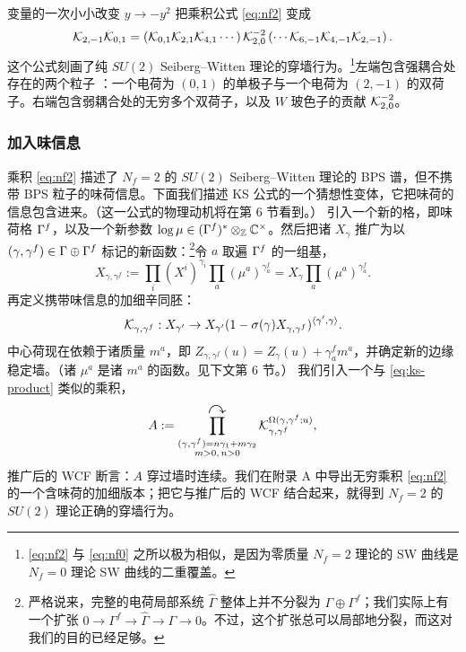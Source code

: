 变量的一次小小改变 $y \to -y^2$ 把乘积公式 \eqref{eq:nf2} 变成
\begin{equation} \label{eq:nf0}
\mathcal{K}_{2,-1} \mathcal{K}_{0,1} = \left( \mathcal{K}_{0,1} \mathcal{K}_{2,1} \mathcal{K}_{4,1} \cdots \right)
\mathcal{K}_{2,0}^{-2} \left( \cdots \mathcal{K}_{6,-1} \mathcal{K}_{4,-1} \mathcal{K}_{2,-1} \right).
\end{equation}
这个公式刻画了纯 $SU(2)$ Seiberg--Witten 理论的穿墙行为。\footnote{\eqref{eq:nf2} 与 \eqref{eq:nf0} 之所以极为相似，是因为零质量 $N_f=2$ 理论的 SW 曲线是 $N_f=0$ 理论 SW 曲线的二重覆盖。}左端包含强耦合处存在的两个粒子 \cite{Ferrari:1996sv}：一个电荷为 $(0,1)$ 的单极子与一个电荷为 $(2,-1)$ 的双荷子。右端包含弱耦合处的无穷多个双荷子，以及 $W$ 玻色子的贡献 $\mathcal{K}_{2,0}^{-2}$。

\subsubsection*{加入味信息}

乘积 \eqref{eq:nf2} 描述了 $N_f = 2$ 的 $SU(2)$ Seiberg--Witten 理论的 BPS 谱，但不携带 BPS 粒子的味荷信息。下面我们描述 KS 公式的一个猜想性变体，它把味荷的信息包含进来。（这一公式的物理动机将在第 6 节看到。）%
引入一个新的格，即味荷格 $\Gamma^f$，以及一个新参数 $\log \mu \in (\Gamma^f)^* \otimes_{\mathbb{Z}} \mathbb{C}^\times$。然后把诸 $X_\gamma$ 推广为以 $(\gamma,\gamma^f) \in \Gamma \oplus \Gamma^f$ 标记的新函数：\footnote{严格说来，完整的电荷局部系统 $\hat\Gamma$ 整体上并不分裂为 $\Gamma \oplus \Gamma^f$；我们实际上有一个扩张 $0 \to \Gamma^f \to \hat\Gamma \to \Gamma \to 0$。不过，这个扩张总可以局部地分裂，而这对我们的目的已经足够。}令 $a$ 取遍 $\Gamma^f$ 的一组基，
\begin{equation}
X_{\gamma,\gamma^f} := \prod_i (X^i)^{\gamma_i} \prod_a
(\mu^a)^{\gamma^f_a} = X_\gamma \prod_a (\mu^a)^{\gamma^f_a}.
\end{equation}
再定义携带味信息的加细辛同胚：
\begin{equation}
\mathcal{K}_{\gamma,\gamma^f} : X_{\gamma'} \to X_{\gamma'} (1- \sigma(\gamma)
X_{\gamma,\gamma^f})^{\langle \gamma',\gamma \rangle}.
\end{equation}
中心荷现在依赖于诸质量 $m^a$，即 $Z_{\gamma,\gamma^f}(u) = Z_\gamma(u) + \gamma^f_a m^a$，并确定新的边缘稳定墙。（诸 $\mu^a$ 是诸 $m^a$ 的函数。见下文第 6 节。）%
我们引入一个与 \eqref{eq:ks-product} 类似的乘积，
\begin{equation} \label{eq:ks-product-masses}
A := \prod^{\text{\Large$\curvearrowright$}}_{\substack{(\gamma,\gamma^f) = n \gamma_1 + m \gamma_2 \\ m>0,\,n>0}}
\mathcal{K}_{\gamma,\gamma^f}^{\Omega(\gamma,\gamma^f;u)},
\end{equation}
推广后的 WCF 断言：$A$ 穿过墙时连续。我们在附录 A 中导出无穷乘积 \eqref{eq:nf2} 的一个含味荷的加细版本；把它与推广后的 WCF 结合起来，就得到 $N_f = 2$ 的 $SU(2)$ 理论正确的穿墙行为。%

